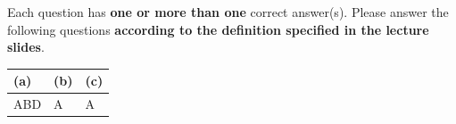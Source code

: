 
Each question has \textbf{one or more than one} correct answer(s). Please answer the following questions \textbf{according to  the definition specified in the lecture slides}.


\begin{table}[htbp]
	\centering
	\begin{tabular}{|p{2cm}|p{2cm}|p{2cm}|}
		\hline
		(a) & (b) & (c) \\
		\hline
		 ABD   &  A   &  A   \\
		\hline
	\end{tabular}
\end{table}

